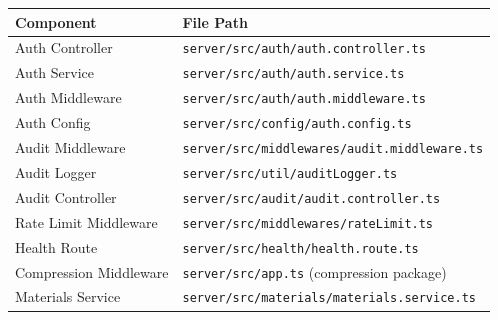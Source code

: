 \documentclass[12pt,oneside,a4paper]{article}
\begin{document}
\begin{tabularx}{\textwidth}{|l|X|}
    \hline
    \textbf{Component} & \textbf{File Path} \\
    \hline
    Auth Controller & \texttt{server/src/auth/auth.controller.ts} \\
    Auth Service & \texttt{server/src/auth/auth.service.ts} \\
    Auth Middleware & \texttt{server/src/auth/auth.middleware.ts} \\
    Auth Config & \texttt{server/src/config/auth.config.ts} \\
    Audit Middleware & \texttt{server/src/middlewares/audit.middleware.ts} \\
    Audit Logger & \texttt{server/src/util/auditLogger.ts} \\
    Audit Controller & \texttt{server/src/audit/audit.controller.ts} \\
    Rate Limit Middleware & \texttt{server/src/middlewares/rateLimit.ts} \\
    Health Route & \texttt{server/src/health/health.route.ts} \\
    Compression Middleware & \texttt{server/src/app.ts} (compression package) \\
    Materials Service & \texttt{server/src/materials/materials.service.ts} \\
    \hline
\end{tabularx}
\end{document}
